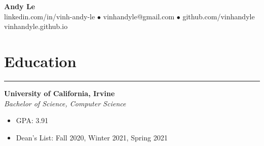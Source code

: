 \documentclass{article}
\begin{document}
   \begin{center}
      \Huge\textbf{Andy Le}\\
      \normalsize{linkedin.com/in/vinh-andy-le} $\bullet$
      \normalsize{vinhandyle@gmail.com} $\bullet$
      \normalsize{github.com/vinhandyle}\\
      \normalsize{vinhandyle.github.io}
   \end{center}
\vspace{-20pt}

\section*{Education} \vspace{-6pt} \hrule \vspace{6pt}
\textbf{University of California, Irvine}\\
\textit{Bachelor of Science, Computer Science}
\begin{itemize}
	\item\vspace{-6pt} GPA: 3.91
	\item\vspace{-6pt} Dean's List: Fall 2020, Winter 2021, Spring 2021
\end{itemize}
\vspace{-20pt}
\end{document}
